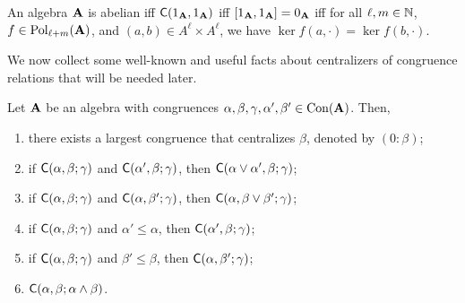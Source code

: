 \begin{remark}
An algebra $\mathbf{A}$ is abelian iff $\mathsf{C}(1_{\mathbf{A}}, 1_{\mathbf{A}})$
iff $[1_{\mathbf{A}}, 1_{\mathbf{A}}] = 0_{\mathbf{A}}$ iff 
for all 
$\ell, m \in \mathbb{N}$,  $f\in \operatorname{Pol}_{\ell + m}(\mathbf{A})$, and 
$(a, b)\in A^\ell\times A^\ell$, we have
$\ker f(a, \cdot)=\ker f(b, \cdot)$.
\end{remark}

We now collect some well-known and useful facts about centralizers of congruence
relations that will be needed later.

\begin{lemma}
\label{lem:centralizers}
Let $\mathbf{A}$ be an algebra with congruences 
$\alpha, \beta, \gamma, \alpha', \beta' \in \operatorname{Con}(\mathbf{A})$.
Then,
\begin{enumerate}
\item \label{fact:centralizer}  
  there exists a largest congruence that centralizes $\beta$,
  denoted by $(0:\beta)$;
\item \label{fact:centralizing_over_join1}
  if $\mathsf{C}(\alpha, \beta; \gamma)$ and $\mathsf{C}(\alpha', \beta; \gamma)$, then
  $\mathsf{C}(\alpha \vee \alpha', \beta; \gamma)$;
\item \label{fact:centralizing_over_join2}
  if $\mathsf{C}(\alpha, \beta; \gamma)$ and $\mathsf{C}(\alpha, \beta'; \gamma)$, then
  $\mathsf{C}(\alpha, \beta \vee \beta'; \gamma)$;
\item \label{fact:monotone_centralizers1}
  if $\mathsf{C}(\alpha, \beta; \gamma)$ and $\alpha' \leq \alpha$, then 
  $\mathsf{C}(\alpha', \beta; \gamma)$;
\item \label{fact:monotone_centralizers2}
  if $\mathsf{C}(\alpha, \beta; \gamma)$ and $\beta' \leq \beta$, then
  $\mathsf{C}(\alpha, \beta'; \gamma)$;
\item \label{fact:centralizing_over_meet}
  $\mathsf{C}(\alpha, \beta; \alpha \wedge \beta)$.
\end{enumerate}
\end{lemma}

